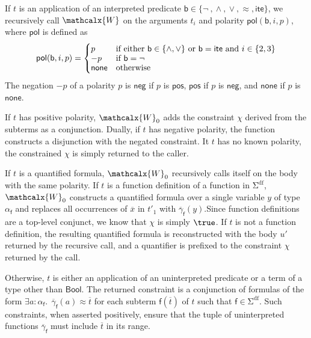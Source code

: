 \documentclass[runningheads,a4paper]{llncs}
\newcommand\pneg{-}
\newcommand{\con}[1]{\mathsf{#1}}
\renewcommand\vec[1]{\overline{#1}}
\let\oldSigma=\Sigma
\def\Sigma{\mathrm{\oldSigma}}
\let\oldneg=\neg
\def\neg{\oldneg\:}
\let\oldvee=\vee
\def\vee{\mathrel{\oldvee}}
\let\oldwedge=\wedge
\def\wedge{\mathrel{\oldwedge}}
\newcommand{\teq}{\approx}
\newcommand{\conv}{\mathcalx{W}}
\newcommand{\sfundefs}[1]{#1^\mathrm{df}}
\newcommand{\pnone}{\con{none}}
\newcommand{\ptrue}{\con{pos}}
\newcommand{\pfalse}{\con{neg}}
\newcommand{\pol}{\con{pol}}
\newcommand\ty[1]{\con{#1}}
\newcommand{\Bool}{\ty{Bool}}
\newcommand{\lite}{\con{ite}}
\newcommand\concret{\gamma} %
\newcommand{\boolop}{\con{b}}
\newcommand{\vecfarg}[1]{\vec{\concret}_{#1}}
\newcommand{\fargsort}[1]{\alpha_{#1}}
\begin{document}
If $t$ is an application of an interpreted predicate $\boolop
\in \{{\neg}, {\wedge}, {\vee}, {\teq}, {\lite}\}$,
we recursively call $\conv$ on the arguments $t_i$ and polarity $\pol( \boolop,
i, p )$, where $\pol$ is defined as
\begin{equation*}
\pol( \boolop, i, p ) =
\begin{cases}
p & \text{if either $\boolop \in \{{\wedge}, {\vee}\}$ or $\boolop = \lite$ and $i \in \{2, 3\}$} \\[-\jot]
\pneg p & \text{if $\boolop = {\neg}$} \\[-\jot]
\pnone & \text{otherwise}
\end{cases}
\end{equation*}
The negation $\pneg p$ of a polarity $p$ is $\pfalse$ if $p$ is $\ptrue$, $\ptrue$
if $p$ is $\pfalse$, and $\pnone$ if $p$ is $\pnone$.

If $t$ has positive polarity, $\conv_0$ adds the constraint $\chi$ derived from
the subterms as a conjunction. Dually, if $t$ has negative polarity, the
function constructs a disjunction with the negated constraint. It $t$ has no
known polarity, the constrained $\chi$ is simply returned to the caller.

If $t$ is a quantified formula, $\conv_0$ recursively calls itself on the body
with the same polarity. If $t$ is a function definition of a function in
$\sfundefs{\Sigma}$, $\conv_0$ constructs a quantified formula over a single variable
$y$ of type $\fargsort{\con{f}}$ and replaces all occurrences of $\vec x$ in
$t'_1$ with $\vecfarg{\con{f}}( y )$.Since function definitions
are a top-level conjunct, %
we know that $\chi$ is simply $\true$.
If $t$ is not a function definition, the resulting
quantified formula is reconstructed with the body $u'$ returned by the
recursive call, and a quantifier is prefixed to the constraint $\chi$
returned by the call.

Otherwise, $t$ is either an application of an uninterpreted predicate or a term
of a type other than $\Bool$. The returned constraint is a conjunction of
formulas of the form $\exists a : {\fargsort{\con{f}}}.\;\, \vecfarg{\con{f}}(
a ) \teq \vec t$ for each subterm $\con{f}( \vec t )$ of $t$ such that $\con{f}
\in \sfundefs{\Sigma}$. Such constraints, when asserted positively, ensure that
the tuple of uninterpreted functions $\vecfarg{\con{f}}$ must include $\vec t$
in its range.

\end{document}
